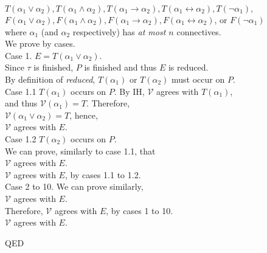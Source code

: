 \documentclass[12pt, letterpaper]{article}
\begin{document}
{\begin{tabbing}
    \> \> $T(\alpha_1 \lor \alpha_2), T(\alpha_1 \land \alpha_2), T(\alpha_1 \rightarrow \alpha_2), T(\alpha_1 \leftrightarrow \alpha_2), T(\neg \alpha_1),$ \\
    \> \> $F(\alpha_1 \lor \alpha_2), F(\alpha_1 \land \alpha_2), F(\alpha_1 \rightarrow \alpha_2), F(\alpha_1 \leftrightarrow \alpha_2)$, or $F(\neg \alpha_1)$ \\
    \> \> where $\alpha_1$ (and $\alpha_2$ respectively) has {\em at
    most $n$} connectives. \\
    \> We prove by cases. \\
    \> Case 1. $E=T(\alpha_1 \lor \alpha_2)$. \\
    \> \> Since $\tau$ is finished, $P$ is finished and thus $E$ is reduced. \\
    \> \> By definition of {\em reduced}, $T(\alpha_1)$ or $T(\alpha_2)$ must occur on $P$. \\
    \> \> Case 1.1 $T(\alpha_1)$ occurs on $P$. By IH, $\mathcal{V}$ agrees with $T(\alpha_1)$, \\
    \> \> \> and thus $\mathcal{V}(\alpha_1)=T$. Therefore, \\
    \> \> \> $\mathcal{V}(\alpha_1 \lor \alpha_2)=T$, hence, \\
    \> \> \> $\mathcal{V}$ agrees with $E$. \\
    \> \> Case 1.2 $T(\alpha_2)$ occurs on $P$. \\
    \> \> \> We can prove, similarly to case 1.1, that \\
    \> \> \> $\mathcal{V}$ agrees with $E$. \\
    \> \> $\mathcal{V}$ agrees with $E$, by cases 1.1 to 1.2. \\
    \> Case 2 to 10. We can prove similarly, \\
    \> \> $\mathcal{V}$ agrees with $E$. \\
    \> Therefore, $\mathcal{V}$ agrees with $E$, by cases 1 to 10. \\
    $\mathcal{V}$ agrees with $E$.
    \end{tabbing}
  }

\noindent QED
\end{document}
